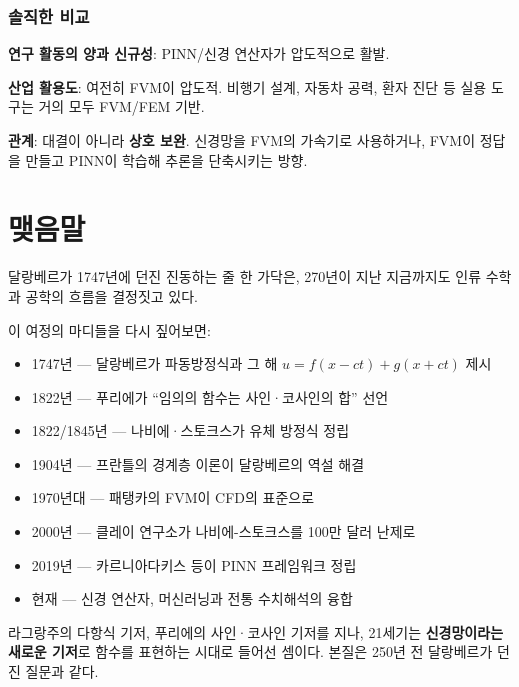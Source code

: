 \documentclass[11pt,a4paper]{article}
\begin{document}
\subsubsection{솔직한 비교}

\begin{notebox}
\textbf{연구 활동의 양과 신규성}: PINN/신경 연산자가 압도적으로 활발.

\textbf{산업 활용도}: 여전히 FVM이 압도적. 비행기 설계, 자동차 공력, 환자 진단 등 실용 도구는 거의 모두 FVM/FEM 기반.

\textbf{관계}: 대결이 아니라 \textbf{상호 보완}. 신경망을 FVM의 가속기로 사용하거나, FVM이 정답을 만들고 PINN이 학습해 추론을 단축시키는 방향.
\end{notebox}

\section{맺음말}

달랑베르가 1747년에 던진 진동하는 줄 한 가닥은, 270년이 지난 지금까지도 인류 수학과 공학의 흐름을 결정짓고 있다.

이 여정의 마디들을 다시 짚어보면:

\begin{itemize}[leftmargin=*, itemsep=2pt]
  \item 1747년 --- 달랑베르가 파동방정식과 그 해 $u = f(x-ct) + g(x+ct)$ 제시
  \item 1822년 --- 푸리에가 ``임의의 함수는 사인·코사인의 합'' 선언
  \item 1822/1845년 --- 나비에·스토크스가 유체 방정식 정립
  \item 1904년 --- 프란틀의 경계층 이론이 달랑베르의 역설 해결
  \item 1970년대 --- 패탱카의 FVM이 CFD의 표준으로
  \item 2000년 --- 클레이 연구소가 나비에-스토크스를 100만 달러 난제로
  \item 2019년 --- 카르니아다키스 등이 PINN 프레임워크 정립
  \item 현재 --- 신경 연산자, 머신러닝과 전통 수치해석의 융합
\end{itemize}

라그랑주의 다항식 기저, 푸리에의 사인·코사인 기저를 지나, 21세기는 \textbf{신경망이라는 새로운 기저}로 함수를 표현하는 시대로 들어선 셈이다. 본질은 250년 전 달랑베르가 던진 질문과 같다.
\end{document}
